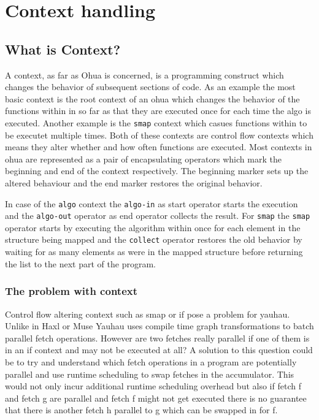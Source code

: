 
\chapter{Context handling} %

\label{ChapterContext} %


\section{What is Context?}

A context, as far as Ohua is concerned, is a programming construct which changes the behavior of subsequent sections of code.
As an example the most basic context is the root context of an ohua  which changes the behavior of the functions within in so far as that they are executed once for each time the algo is executed.
Another example is the \texttt{smap} context which casues functions within to be executet multiple times.
Both of these contexts are control flow contexts which means they alter whether and how often functions are executed.
Most contexts in ohua are represented as a pair of encapsulating operators which mark the beginning and end of the context respectively.
The beginning marker sets up the altered behaviour and the end marker restores the original behavior.

In case of the \texttt{algo} context the \texttt{algo-in} as start operator starts the execution and the \texttt{algo-out} operator as end operator collects the result.
For \texttt{smap} the \texttt{smap} operator starts by executing the algorithm within once for each element in the structure being mapped and the \texttt{collect} operator restores the old behavior by waiting for as many elements as were in the mapped structure before returning the list to the next part of the program.

\subsection{The problem with context}


Control flow altering context such as smap or if pose a problem for yauhau.
Unlike in Haxl or Muse Yauhau uses compile time graph transformations to batch parallel fetch operations.
However are two fetches really parallel if one of them is in an if context and may not be executed at all?
A solution to this question could be to try and understand which fetch operations in a program are potentially parallel and use runtime scheduling to swap fetches in the accumulator.
This would not only incur additional runtime scheduling overhead but also if fetch f and fetch g are parallel and fetch f might not get executed there is no guarantee that there is another fetch h parallel to g which can be swapped in for f.

